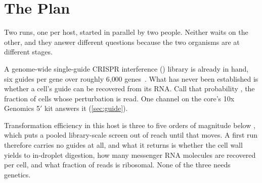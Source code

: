 
\section{The Plan}
\label{sec:plan}

Two runs, one per host, started in parallel by two people. Neither waits on the
other, and they answer different questions because the two organisms are at
different stages.

 A
genome-wide single-guide CRISPR interference () library is already
in hand, six guides per gene over roughly 6{,}000
genes~\citep{lianMultifunctionalGenomewideCRISPR2019}. What has never been
established is whether a cell's guide can be recovered from its RNA. Call that
probability , the fraction of cells whose perturbation is read. One
channel on the core's 10x Genomics 5$'$ kit answers it (\cref{sec:guide}).

Transformation efficiency in this host is three to five orders of magnitude
below , which puts a pooled library-scale screen out of
reach until that moves. A first run therefore carries no guides at all, and what
it returns is whether the cell wall yields to in-droplet digestion, how many
messenger RNA molecules are recovered per cell, and what fraction of reads is
ribosomal. None of the three needs genetics.



